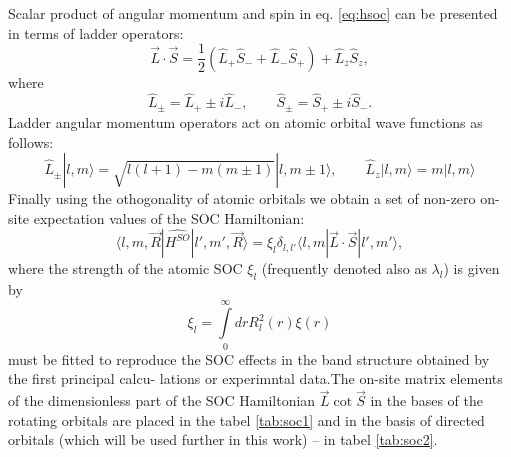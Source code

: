 Scalar product of angular momentum and spin in eq. \ref{eq:hsoc} can be presented in terms of ladder operators:
\begin{equation}
	\vec{L} \cdot \vec{S} = \frac{1}{2} (\hat{L}_{+} \hat{S}_{-} + \hat{L}_{-} \hat{S}_{+}) + \hat{L}_z \hat{S}_z,
\end{equation}
where
\begin{equation}
	\hat{L}_{\pm} = \hat{L}_{+} \pm i\hat{L}_{-},\qquad \hat{S}_{\pm} = \hat{S}_{+} \pm i\hat{S}_{-}.
\end{equation}
Ladder angular momentum operators act on atomic orbital wave functions as follows:
\begin{equation}
	\hat{L}_{\pm} |l, m \rangle = \sqrt{l(l+1) - m (m \pm 1)} |l, m \pm 1 \rangle, \qquad \hat{L}_z |l, m \rangle = m |l, m \rangle
\end{equation}
Finally using the othogonality of atomic orbitals we obtain a set of non-zero on-site expectation values of the SOC Hamiltonian:
\begin{equation}
 	\langle l,m, \vec{R} | \hat{H^{SO}} | l', m', \vec{R} \rangle = \xi_l \delta_{l,l'} \langle l, m | \vec{L} \cdot \vec{S} | l', m' \rangle,
\end{equation} 
where the strength of the atomic SOC $\xi_l$ (frequently denoted also as $\lambda_l$) is given by 
\begin{equation}
	\xi_l = \int\limits^\infty_0 dr R^2_l(r) \xi(r)
\end{equation}
must be fitted to reproduce the SOC effects in the band structure obtained by the first principal calcu-
lations or experimntal data.The on-site matrix elements of the dimensionless part of the SOC Hamiltonian $\vec{L} \cot \vec{S} $ in the bases of the rotating orbitals are placed in the tabel \ref{tab:soc1} and in the basis of directed orbitals (which will be used further in this work) -- in tabel \ref{tab:soc2}.

